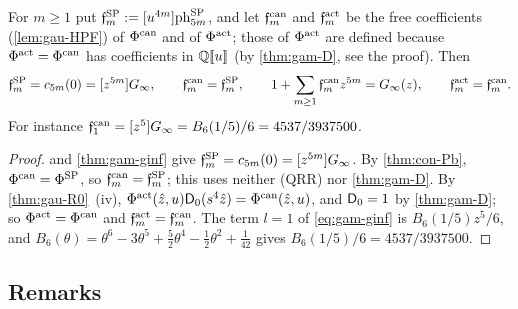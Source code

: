 \begin{cor}
\label{cor:gam-free}
For $m\geq 1$ put $\mathfrak{f}^{\mathrm{SP}}_m:=[u^{4m}]\mathrm{ph}^{\mathrm{SP}}_{5m}$, and let $\mathfrak{f}^{\mathrm{can}}_m$ and $\mathfrak{f}^{\mathrm{act}}_m$ be the free coefficients (\cref{lem:gau-HPF}) of $\Phi^{\mathrm{can}}$ and of $\Phi^{\mathrm{act}}$; those of $\Phi^{\mathrm{act}}$ are defined because $\Phi^{\mathrm{act}}=\Phi^{\mathrm{can}}$ has coefficients in $\mathbb{Q}[\![ u ]\!]$ (by \cref{thm:gam-D}, see the proof). Then
\[
\mathfrak{f}^{\mathrm{SP}}_m=c_{5m}(0)=[z^{5m}]G_{\infty},\qquad \mathfrak{f}^{\mathrm{can}}_m=\mathfrak{f}^{\mathrm{SP}}_m,\qquad 1+\sum_{m\geq 1}\mathfrak{f}^{\mathrm{can}}_mz^{5m}=G_{\infty}(z),\qquad \mathfrak{f}^{\mathrm{act}}_m=\mathfrak{f}^{\mathrm{can}}_m.
\]
For instance $\mathfrak{f}^{\mathrm{can}}_1=[z^5]G_{\infty}=B_6(1/5)/6=4537/3937500$.
\end{cor}

\begin{proof}
 and \cref{thm:gam-ginf} give $\mathfrak{f}^{\mathrm{SP}}_m=c_{5m}(0)=[z^{5m}]G_{\infty}$. By \cref{thm:con-Pb}, $\Phi^{\mathrm{can}}=\Phi^{\mathrm{SP}}$, so $\mathfrak{f}^{\mathrm{can}}_m=\mathfrak{f}^{\mathrm{SP}}_m$; this uses neither (QRR) nor \cref{thm:gam-D}. By \cref{thm:gau-R0}~(iv), $\Phi^{\mathrm{act}}(\hat{z},u)\mathsf{D}_0(s^4\hat{z})=\Phi^{\mathrm{can}}(\hat{z},u)$, and $\mathsf{D}_0=1$ by \cref{thm:gam-D}; so $\Phi^{\mathrm{act}}=\Phi^{\mathrm{can}}$ and $\mathfrak{f}^{\mathrm{act}}_m=\mathfrak{f}^{\mathrm{can}}_m$. The term $l=1$ of \eqref{eq:gam-ginf} is $B_6(1/5)z^5/6$, and $B_6(\theta)=\theta^6-3\theta^5+\tfrac52\theta^4-\tfrac12\theta^2+\tfrac1{42}$ gives $B_6(1/5)/6=4537/3937500$.
\end{proof}

\subsection{Remarks}
\label{sec:gam-rmk}

